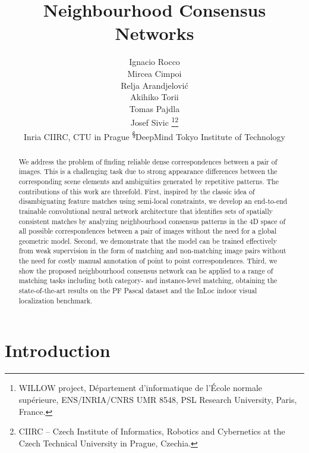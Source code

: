 \documentclass{article}
\begin{document}
\title{Neighbourhood Consensus Networks}

\author{
  Ignacio Rocco \\
  \And
  Mircea Cimpoi\\
  \And
  Relja Arandjelovi\'c\\
  \And
  Akihiko Torii\\
  \And
  Tomas Pajdla\\
  \And
  Josef Sivic
  \thanks{WILLOW project, Département d’informatique de l’École normale supérieure,  ENS/INRIA/CNRS UMR 8548, PSL Research University, Paris, France.}\thanks{CIIRC -- Czech Institute of Informatics, Robotics and Cybernetics at the Czech Technical University in Prague, Czechia.}\\
  \AND
\normalfont
\normalsize\textsuperscript{}Inria\quad 
\normalsize\textsuperscript{}CIIRC, CTU in Prague\quad 
\normalsize\textsuperscript{\S}DeepMind\quad 
\normalsize\textsuperscript{}Tokyo Institute of Technology
}
\maketitle


\begin{abstract}
We address the problem of finding reliable dense correspondences between a pair of images. This is a challenging task due to strong appearance differences between the corresponding scene elements and ambiguities generated by repetitive patterns. The contributions of this work are threefold. First, inspired by the classic idea of disambiguating feature matches using semi-local constraints,  we develop an end-to-end trainable convolutional neural network architecture that identifies sets of spatially consistent  matches by analyzing neighbourhood consensus patterns in the 4D space of all possible correspondences between a pair of images without the need for a global geometric model. Second, we demonstrate that the model can be trained effectively from weak supervision in the form of matching and non-matching image pairs without the need for costly manual annotation of point to point correspondences.
Third, we show the proposed neighbourhood consensus network can be applied to a range of matching tasks including both category- and instance-level matching, obtaining the state-of-the-art results on the PF Pascal dataset and the InLoc indoor visual localization benchmark.
\end{abstract}

\section{Introduction \label{sec:intro}}
\end{document}
